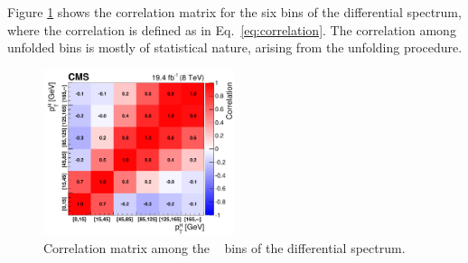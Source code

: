 Figure \ref{fig:cov_matrix} shows  the correlation matrix for the six bins of the differential spectrum, where the correlation is defined as in Eq.~\eqref{eq:correlation}. The correlation among unfolded bins is mostly of statistical nature, arising from the unfolding procedure.

\begin{figure}[!htb]
\centering
\includegraphics[width=0.5\textwidth]{images/unblinding/covMatrix.pdf}
\caption{Correlation matrix among the \pth~ bins of the differential spectrum.}\label{fig:cov_matrix}
\end{figure}

